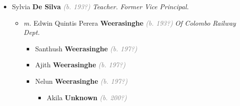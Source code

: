 \documentclass[10pt, openany]{book}
\begin{document}
\begin{itemize}
{\begin{itemize}
{\begin{itemize}
{\begin{itemize}
{\begin{itemize}
{\begin{itemize}
{\begin{itemize}
\item{\textit{m.} Danila \textbf{Unknown} \textcolor{gray}{\textit{(b. 197?)}} \textcolor{slmaroon}{\textit{Italian.}}   \label{couple:00000337:00000870} \begin{itemize}
\item{S \textbf{Jayasinghe} \textcolor{gray}{\textit{(b. 200?)}}
 }
\item{Isabelle \textbf{Jayasinghe} \textcolor{gray}{\textit{(b. 200?)}}
 }
\end{itemize}}
\end{itemize}
 }
\item{Nimal \textbf{Jayasinghe} \textcolor{gray}{\textit{(b. 197?)}} \textcolor{slmaroon}{\textit{Director Hoechst.}}
\begin{itemize}
\item{\textit{m.} Nelun \textbf{De Silva} \textcolor{gray}{\textit{(b. 197?)}}   \label{couple:00000157:00000334} \begin{itemize}
\item{Manisha \textbf{Jayasinghe} \textcolor{gray}{\textit{(b. 200?)}}
 }
\end{itemize}}
\end{itemize}
 }
\end{itemize}}
\end{itemize}
  }
\item{Sylvia \textbf{De Silva} \textcolor{gray}{\textit{(b. 193?)}} \textcolor{slmaroon}{\textit{Teacher.
Former Vice Principal.}}
\begin{itemize}
\item{\textit{m.} Edwin Quintis Perera \textbf{Weerasinghe} \textcolor{gray}{\textit{(b. 193?)}} \textcolor{slmaroon}{\textit{Of Colombo Railway Dept.}}   \label{couple:00000166:00000936} \begin{itemize}
\item{Santhush \textbf{Weerasinghe} \textcolor{gray}{\textit{(b. 197?)}}
 }
\item{Ajith \textbf{Weerasinghe} \textcolor{gray}{\textit{(b. 197?)}}
 }
\item{Nelun \textbf{Weerasinghe} \textcolor{gray}{\textit{(b. 197?)}}
\begin{itemize}
\item{Akila \textbf{Unknown} \textcolor{gray}{\textit{(b. 200?)}}
}
\end{itemize}}
\end{itemize}}
\end{itemize}}
\end{itemize}}
\end{itemize}}
\end{itemize}}
\end{itemize}
\end{document}
